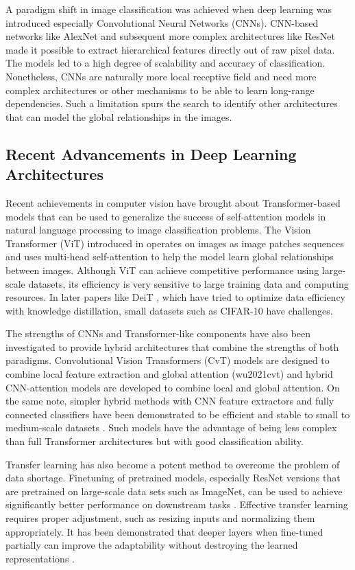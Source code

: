 \documentclass[conference]{IEEEtran}
\begin{document}
A paradigm shift in image classification was achieved when deep learning was introduced especially Convolutional Neural Networks (CNNs). CNN-based networks like AlexNet \cite{krizhevsky2012imagenet} and subsequent more complex architectures like ResNet \cite{he2016deep} made it possible to extract hierarchical features directly out of raw pixel data. The models led to a high degree of scalability and accuracy of classification. Nonetheless, CNNs are naturally more local receptive field and need more complex architectures or other mechanisms to be able to learn long-range dependencies. Such a limitation spurs the search to identify other architectures that can model the global relationships in the images.

\subsection{Recent Advancements in Deep Learning Architectures}

Recent achievements in computer vision have brought about Transformer-based models that can be used to generalize the success of self-attention models in natural language processing to image classification problems. The Vision Transformer (ViT) introduced in \cite{dosovitskiy2021image} operates on images as image patches sequences and uses multi-head self-attention to help the model learn global relationships between images. Although ViT can achieve competitive performance using large-scale datasets, its efficiency is very sensitive to large training data and computing resources. In later papers like DeiT \cite{touvron2021training}, which have tried to optimize data efficiency with knowledge distillation, small datasets such as CIFAR-10 have challenges.

The strengths of CNNs and Transformer-like components have also been investigated to provide hybrid architectures that combine the strengths of both paradigms. Convolutional Vision Transformers (CvT) \cite{wu2021cvt} models are designed to combine local feature extraction and global attention (wu2021cvt) and hybrid CNN-attention models are developed to combine local and global attention. On the same note, simpler hybrid methods with CNN feature extractors and fully connected classifiers have been demonstrated to be efficient and stable to small to medium-scale datasets \cite{szegedy2015going}. Such models have the advantage of being less complex than full Transformer architectures but with good classification ability.

Transfer learning has also become a potent method to overcome the problem of data shortage. Finetuning of pretrained models, especially ResNet versions that are pretrained on large-scale data sets such as ImageNet, can be used to achieve significantly better performance on downstream tasks \cite{he2016deep}. Effective transfer learning requires proper adjustment, such as resizing inputs and normalizing them appropriately. It has been demonstrated that deeper layers when fine-tuned partially can improve the adaptability without destroying the learned representations \cite{yosinski2014transferable}.
\end{document}
